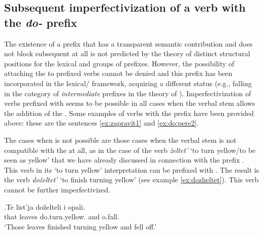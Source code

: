\subsection{Subsequent imperfectivization of a verb with the \textit{do-} prefix}
The existence of a prefix that has a transparent semantic contribution and does not block subsequent  at all is not predicted by the theory of distinct structural positions for the lexical and  groups of prefixes. However, the possibility of attaching the  to prefixed verbs cannot be denied and this prefix has been incorporated in the lexical/ framework, acquiring a different status (e.g., falling in the category of \textit{intermediate} prefixes in the theory of \citealt{Tatevosov:07}). Imperfectivization of verbs prefixed with  seems to be possible in all cases when the verbal stem allows the addition of the . Some examples of  verbs with the prefix  have been provided above: these are the sentences \ref{ex:zapravit1} and \ref{ex:do:pere2}.

The cases when  is not possible are those cases when the verbal stem is not compatible with the  at all, as in the case of the verb \textit{\v{z}eltet'} `to turn yellow/to be seen as yellow' that we have already discussed in connection with the prefix . This verb in its `to turn yellow' interpretation can be prefixed with . The result is the verb \textit{do\v{z}eltet'} `to finish turning yellow' (see example \ref{ex:dozheltet}). This verb cannot be further imperfectivized. 

\exg.\label{ex:dozheltet}Te list'ja do\v{z}elteli i opali.\\
that leaves do.turn.yellow. and o.fall.\\
\trans `Those leaves finished turning yellow and fell off.'\\

